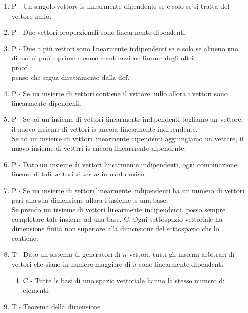\documentclass[]{article}
\begin{document}
\begin{enumerate}
	\item P - Un singolo vettore is linearmente dipendente se e solo se si tratta del vettore nullo.

	\item P - Due vettori proporzionali sono linearmente dipendenti.

	\item P - Due o pi\`u vettori sono linearmente indipendenti se e solo se almeno uno di essi si può esprimere come combinazione lineare degli altri. \\
			  proof.: \\
			  penso che segua direttamente dalla def.

	\item P - Se un insieme di vettori contiene il vettore nullo allora i vettori sono linearmente dipendenti.

	\item P - Se ad un insieme di vettori linearmente indipendenti togliamo un vettore, il nuovo insieme di vettori is ancora linearmente indipendente. \\	
Se ad un insieme di vettori linearmente dipendenti aggiungiamo un vettore, il nuovo insieme di vettori is ancora linearmente dipendente.

	\item P - Dato un insieme di vettori linearmente indipendenti, ogni combinazione lineare di tali vettori si scrive in modo unico.

	\item P - Se un insieme di vettori linearmente indipendenti ha un numero di vettori pari alla sua dimensione allora l'insieme is una base. \\	
		  Se prendo un insieme di vettori linearmente indipendenti, posso sempre completare tale insieme ad una base.
		\subitem C. Ogni sottospazio vettoriale ha dimensione finita non superiore alla dimensione del sottospazio che lo contiene.

	\item T - Dato un sistema di generatori di $n$ vettori, tutti gli insiemi arbitrari di vettori che siano in numero maggiore di $n$ sono linearmente dipendenti.
		\begin{enumerate}
		  	\item C - Tutte le basi di uno spazio vettoriale hanno lo stesso numero di elementi.
	    \end{enumerate}
	\item T - Teorema della dimensione
	

\end{enumerate}
\end{document}
